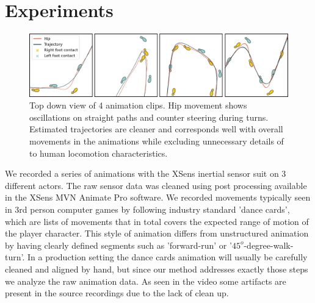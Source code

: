 \section{Experiments}

\begin{figure}
    \centering
    \includegraphics[width=1.0\columnwidth]{img/estimated_trajectory_examples_small.png}
    \caption{Top down view of 4 animation clips. Hip movement shows oscillations on straight paths and counter steering during turns. Estimated trajectories are cleaner and corresponds well with overall movements in the animations while excluding unnecessary details of to human locomotion characteristics.}
    \label{fig:results:estimatedtrajectory:examples}
\end{figure}
 
We recorded a series of animations with the XSens inertial sensor suit on 3 different actors. The raw sensor data was cleaned using post processing available in the XSens MVN Animate Pro software. We recorded movements typically seen in 3rd person computer games by following industry standard 'dance cards', which are lists of movements that in total covers the expected range of motion of the player character. This style of animation differs from unstructured animation by having clearly defined segments such as 'forward-run' or '$45^o$-degree-walk-turn'. In a production setting the dance cards animation will usually be carefully cleaned and aligned by hand, but since our method addresses exactly those steps we analyze the raw animation data. As seen in the video some artifacts are present in the source recordings due to the lack of clean up.

